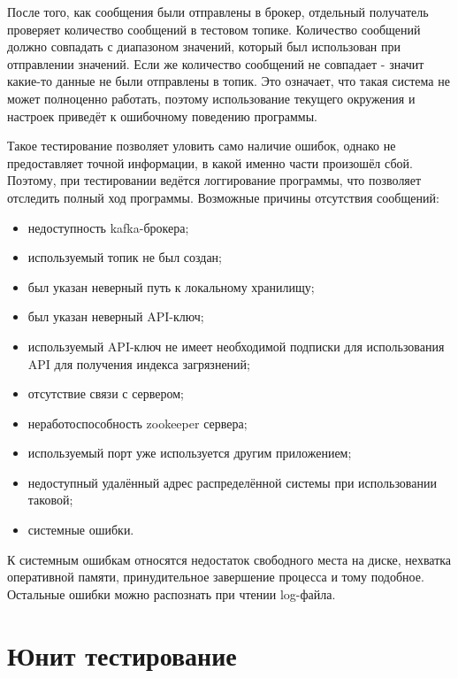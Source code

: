 После того, как сообщения были отправлены в брокер, отдельный получатель проверяет количество сообщений в тестовом топике.
Количество сообщений должно совпадать с диапазоном значений, который был использован при отправлении значений.
Если же количество сообщений не совпадает - значит какие-то данные не были отправлены в топик.
Это означает, что такая система не может полноценно работать, поэтому использование текущего окружения и настроек приведёт к ошибочному поведению программы.

Такое тестирование позволяет уловить само наличие ошибок, однако не предоставляет точной информации, в какой именно части произошёл сбой.
Поэтому, при тестировании ведётся логгирование программы, что позволяет отследить полный ход программы.
Возможные причины отсутствия сообщений:
\begin{itemize}
    \item недоступность kafka-брокера;
    \item используемый топик не был создан;
    \item был указан неверный путь к локальному хранилищу;
    \item был указан неверный API-ключ;
    \item используемый API-ключ не имеет необходимой подписки для использования API для получения индекса загрязнений;
    \item отсутствие связи с сервером;
    \item неработоспособность zookeeper сервера;
    \item используемый порт уже используется другим приложением;
    \item недоступный удалённый адрес распределённой системы при использовании таковой;
    \item системные ошибки.
\end{itemize}

К системным ошибкам относятся недостаток свободного места на диске, нехватка оперативной памяти, принудительное завершение процесса и тому подобное.
Остальные ошибки можно распознать при чтении log-файла.


\section{Юнит тестирование}

